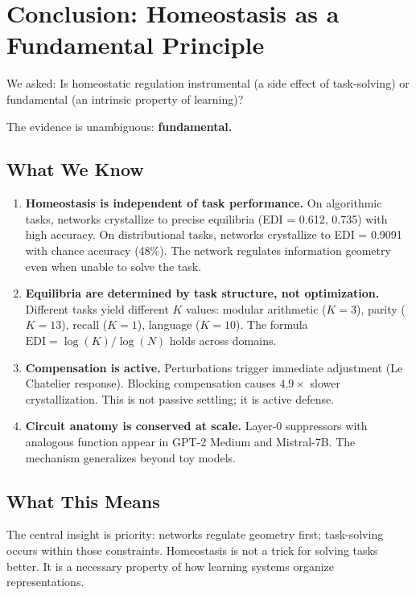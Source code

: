 \section{Conclusion: Homeostasis as a Fundamental Principle}

We asked: Is homeostatic regulation instrumental (a side effect of task-solving) or fundamental (an intrinsic property of learning)?

The evidence is unambiguous: \textbf{fundamental.}

\subsection*{What We Know}

\begin{enumerate}
    \item \textbf{Homeostasis is independent of task performance.}
    On algorithmic tasks, networks crystallize to precise equilibria (EDI = 0.612, 0.735) with high accuracy. On distributional tasks, networks crystallize to EDI = 0.9091 with chance accuracy (48\%). The network regulates information geometry even when unable to solve the task.
    
    \item \textbf{Equilibria are determined by task structure, not optimization.}
    Different tasks yield different $K$ values: modular arithmetic ($K=3$), parity ($K=13$), recall ($K=1$), language ($K=10$). The formula $\text{EDI} = \log(K)/\log(N)$ holds across domains.
    
    \item \textbf{Compensation is active.}
    Perturbations trigger immediate adjustment (Le Chatelier response). Blocking compensation causes $4.9\times$ slower crystallization. This is not passive settling; it is active defense.
    
    \item \textbf{Circuit anatomy is conserved at scale.}
    Layer-0 suppressors with analogous function appear in GPT-2 Medium and Mistral-7B. The mechanism generalizes beyond toy models.
\end{enumerate}

\subsection*{What This Means}

The central insight is priority: networks regulate geometry first; task-solving occurs within those constraints. Homeostasis is not a trick for solving tasks better. It is a necessary property of how learning systems organize representations.

